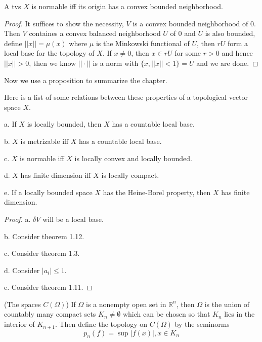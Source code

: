 \documentclass[lang=en, color=blue, ]{elegantbook}
\newcommand{\R}{\mathbb{R}}
\begin{document}
\begin{theorem}
    A tvs $X$ is normable iff its origin has a convex bounded neighborhood.
\end{theorem}
\begin{proof}
    It suffices to show the necessity, $V$ is a convex bounded neighborhood of $0$. Then $V$ containes a convex balanced neighborhood $U$ of $0$ and $U$ is also bounded, define $||x|| = \mu(x)$ where $\mu$ is the Minkowski functional of $U$, then $rU$ form a local base for the topology of $X$. If $x\neq 0$, then $x\in rU$ for some $r>0$ and hence $||x|| > 0$,  then we know $||\cdot||$ is a norm with $\{x,||x|| < 1\} = U$ and we are done.
\end{proof}

Now we use a proposition to summarize the chapter.

\begin{proposition}
    Here is a list of some relations between these properties of a topological vector space $X$.\par
    a. If $X$ is locally bounded, then $X$ has a countable local base.\par
    b. $X$ is metrizable iff $X$ has a countable local base.\par
    c. $X$ is normable iff $X$ is locally convex and locally bounded.\par
    d. $X$ has finite dimension iff $X$ is locally compact.\par
    e. If a locally bounded space $X$ has the Heine-Borel property, then $X$ has finite dimension.
\end{proposition}
\begin{proof}
    a. $\delta V$ will be a local base.\par
    b. Consider theorem 1.12.\par
    c. Consider theorem 1.3.\par
    d. Consider $|a_i| \leq 1$.\par
    e. Consider theorem 1.11.
\end{proof}

\begin{definition}
    (The spaces $C(\Omega)$) If $\Omega$ is a nonempty open set in $\R^n$, then $\Omega$ is the union of countably many compact sets $K_n \neq \emptyset$ which can be chosen so that $K_n$ lies in the interior of $K_{n+1}$. Then define the topology on $C(\Omega)$ by the seminorms
    \[p_n(f) = \sup{|f(x)|, x\in K_n}\]
\end{definition}
\end{document}
